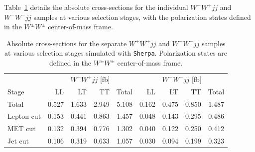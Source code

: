 \documentclass[12pt]{article}
\begin{document}
        Table~\ref{tab:sherpa_WpWm_cross_section} details the absolute cross-sections for the individual $W^{+}W^{+}jj$ and $W^{-}W^{-}jj$ samples at various selection stages, with the polarization states defined in the $W^{\pm}W^{\pm}$ center-of-mass frame.
        \begin{table}[htpb]
            \centering
            \caption{Absolute cross-sections for the separate $W^{+}W^{+}jj$ and $W^{-}W^{-}jj$ samples at various selection stages simulated with \texttt{Sherpa}. Polarization states are defined in the $W^{\pm}W^{\pm}$ center-of-mass frame.}
            \label{tab:sherpa_WpWm_cross_section}
            \begin{tabular}{l|rrrr|rrrr}
                           & \multicolumn{4}{c|}{$W^{+}W^{+}jj$ [fb]} & \multicolumn{4}{c}{$W^{-}W^{-}jj$ [fb]}\\
                Stage      & LL       & LT       & TT       & Total   & LL       & LT       & TT      & Total  \\ \hline
                Total      & 0.527    & 1.633    & 2.949    & 5.108   & 0.162    & 0.475    & 0.850   & 1.487  \\
                Lepton cut & 0.153    & 0.441    & 0.863    & 1.457   & 0.048    & 0.143    & 0.295   & 0.486  \\
                MET cut    & 0.132    & 0.394    & 0.776    & 1.302   & 0.040    & 0.122    & 0.250   & 0.412  \\
                Jet cut    & 0.106    & 0.319    & 0.633    & 1.057   & 0.030    & 0.094    & 0.199   & 0.323  \\
            \end{tabular}
        \end{table}
\end{document}
